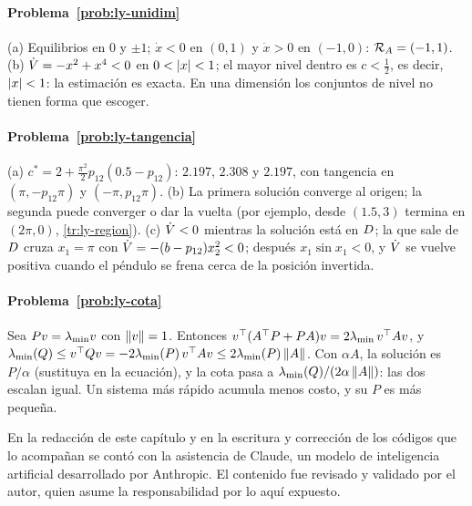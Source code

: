 \paragraph{Problema~\ref{prob:ly-unidim}}
(a) Equilibrios en $0$ y $\pm1$; $\dot x<0$ en $(0,1)$ y $\dot x>0$ en $(-1,0)$: $\mathcal{R}_A=(-1,1)$. (b) $\dot V=-x^2+x^4<0$ en $0<\left\lvert x\right\rvert<1$; el mayor nivel dentro es $c<\tfrac12$, es decir, $\left\lvert x\right\rvert<1$: la estimación es exacta. En una dimensión los conjuntos de nivel no tienen forma que escoger.

\paragraph{Problema~\ref{prob:ly-tangencia}}
(a) $c^*=2+\tfrac{\pi^2}2p_{12}(0.5-p_{12})$: $2.197$, $2.308$ y $2.197$, con tangencia en $(\pi,-p_{12}\pi)$ y $(-\pi,p_{12}\pi)$. (b) La primera solución converge al origen; la segunda puede converger o dar la vuelta (por ejemplo, desde $(1.5,3)$ termina en $(2\pi,0)$, \cref{tr:ly-region}). (c) $\dot V<0$ mientras la solución está en $D$; la que sale de $D$ cruza $x_1=\pi$ con $\dot V=-(b-p_{12})x_2^2<0$; después $x_1\sin x_1<0$, y $\dot V$ se vuelve positiva cuando el péndulo se frena cerca de la posición invertida.

\paragraph{Problema~\ref{prob:ly-cota}}
Sea $Pv=\lambda_{\min} v$ con $\left\lVert v\right\rVert=1$. Entonces $v^{\top}(A^{\top} P+PA)v=2\lambda_{\min}\,v^{\top} Av$, y $\lambda_{\min}(Q)\le v^{\top} Qv=-2\lambda_{\min}(P)\,v^{\top} Av\le2\lambda_{\min}(P)\left\lVert A\right\rVert$. Con $\alpha A$, la solución es $P/\alpha$ (sustituya en la ecuación), y la cota pasa a $\lambda_{\min}(Q)/(2\alpha\left\lVert A\right\rVert)$: las dos escalan igual. Un sistema más rápido acumula menos costo, y su $P$ es más pequeña.

\respuestaspausas

\begin{parallevar}
En la redacción de este capítulo y en la escritura y corrección de los códigos que lo acompañan se contó con la asistencia de Claude, un modelo de inteligencia artificial desarrollado por Anthropic. El contenido fue revisado y validado por el autor, quien asume la responsabilidad por lo aquí expuesto.
\end{parallevar}
